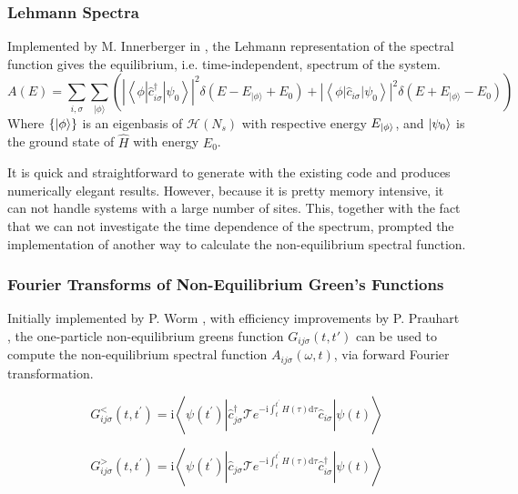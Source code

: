 \subsubsection{Lehmann Spectra}
Implemented by M. Innerberger in \cite{innerberger}, the Lehmann representation of the spectral function gives the equilibrium, i.e. time-independent, spectrum of the system. 
\begin{equation}
    A(E)=\sum_{i, \sigma} \sum_{|\phi\rangle}\left(\left|\left\langle\phi\left|\hat{c}_{i \sigma}^{\dagger}\right| \psi_{0}\right\rangle\right|^{2} \delta\left(E-E_{|\phi\rangle}+E_{0}\right)+\left|\left\langle\phi\left|\hat{c}_{i \sigma}\right| \psi_{0}\right\rangle\right|^{2} \delta\left(E+E_{|\phi\rangle}-E_{0}\right)\right)
\end{equation}
Where $\{ \ket{\phi}\}$ is an eigenbasis of $\mathcal{H}(N_s)$ with respective energy $E_{\ket{\phi}}$, and $\ket{\psi_0}$ is the ground state of $\hat{H}$ with energy $E_0$.

\bigskip
It is quick and straightforward to generate with the existing code and produces numerically elegant results. However, because it is pretty memory intensive, it can not handle systems with a large number of sites. This, together with the fact that we can not investigate the time dependence of the spectrum, prompted the implementation of another way to calculate the non-equilibrium spectral function.

\subsubsection{Fourier Transforms of Non-Equilibrium Green's Functions}

Initially implemented by P. Worm \cite{worm_bachelor}, with efficiency improvements by P. Prauhart \cite{prauhart}, the one-particle non-equilibrium greens function $G_{ij\sigma} (t,t')$ can be used to compute the non-equilibrium spectral function $A_{ij\sigma}(\omega, t)$, via forward Fourier transformation.

\begin{equation}
    G_{i j \sigma}^{<}\left(t, t^{\prime}\right)=\mathrm{i}\left\langle\psi\left(t^{\prime}\right)\left|\hat{c}_{j \sigma}^{\dagger} \mathcal{T} e^{-\mathrm{i} \int_{t}^{t^{\prime}} H(\tau) \mathrm{d} \tau} \hat{c}_{i \sigma}\right| \psi(t)\right\rangle\label{eq:greens_function_lesser}
\end{equation}

\begin{equation}
    G_{i j \sigma}^{>}\left(t, t^{\prime}\right)=\mathrm{i}\left\langle\psi\left(t^{\prime}\right)\left|\hat{c}_{j \sigma} \mathcal{T} e^{-\mathrm{i} \int_{t}^{t^{\prime}} H(\tau) \mathrm{d} \tau} \hat{c}_{i \sigma}^\dagger\right| \psi(t)\right\rangle\label{eq:greens_function_greater}
\end{equation}

